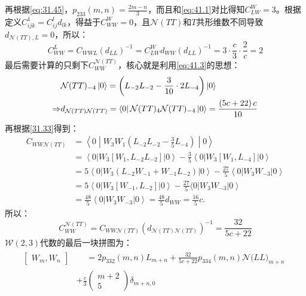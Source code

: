 再根据\ref{eq:31.45}，$p_{233}(m,n)=\frac{2m-n}3$，而且和\ref{eq:41.1}对比得知$C_{LW}^W=3$。根据定义$C_{ijk}^1=C_{ij}^ld_{lk}$，得益于$C^W_{WW}=0$，且$\mathcal{N}(TT)$和$T$共形维数不同导致$d_{\mathcal{N}(TT),L}=0$，所以：
\begin{equation}\label{eq:41.3}
	C_{WW}^L=C_{WWL}\left(d_{LL}\right)^{-1}=C_{LW}^Wd_{WW}\left(d_{LL}\right)^{-1}=3\cdot\frac c3\cdot\frac2c=2
\end{equation}
最后需要计算的只剩下$C_{WW}^{\mathcal{N}(TT)}$，核心就是利用\ref{eq:41.3}的思想：
\begin{equation}
	\begin{aligned}
		&\mathcal{N}(TT)_{-4}\left|0\right\rangle=\left(L_{-2}L_{-2}-\frac3{10}\cdot2L_{-4}\right)\left|0\right\rangle \\
		\Rightarrow&d_{\mathcal{N}(TT)\mathcal{N}(TT)}=\bra{0}\mathcal{N}(TT)_4\mathcal{N}(TT)_{-4}\ket{0}=\frac{\left(5c+22\right)c}{10}
	\end{aligned}
\end{equation}
再根据\ref{31.33}得到：
\begin{equation}
	\begin{aligned}
		C_{WW\mathcal{N}(TT)}& =\left\langle0\middle| W_3W_1\left(L_{-2}L_{-2}-\frac35L_{-4}\right) \middle| 0\right\rangle\\
		&=\left\langle0\right|W_3\left[W_1,L_{-2}L_{-2}\right]\left|0\right\rangle-\frac35\left\langle0\right|W_3\left[W_1,L_{-4}\right]\left|0\right\rangle  \\
		&=5\left<0\right|W_3\left(L_{-2}W_{-1}+W_{-1}L_{-2}\right)\left|0\right>-\frac{27}5\left<0\right|W_3W_{-3}\left|0\right> \\
		&=5\left\langle0\right|W_3\left[W_{-1},L_{-2}\right]\left|0\right\rangle-\frac{27}5\langle0|W_3W_{-3}\left|0\right\rangle  \\
		&=\frac{48}5\left\langle0\right|W_3W_{-3}\left|0\right\rangle=\frac{48}5d_{WW}=\frac{16}5c.
	\end{aligned}
\end{equation}
所以：
\begin{equation}
	C_{WW}^{\mathcal{N}(TT)}=C_{WW\mathcal{N}(TT)}\left(d_{\mathcal{N}(TT)\mathcal{N}(TT)}\right)^{-1}=\frac{32}{5c+22}
\end{equation}
$\mathcal{W}(2,3)$代数的最后一块拼图为：
\begin{equation}
	\begin{aligned}
		\left.\left[\begin{array}{c}W_{m},W_{n}\end{array}\right.\right]& \begin{aligned}&=2p_{332}(m,n)L_{m+n}+\frac{32}{5c+22}p_{334}(m,n)\mathcal{N}\big(LL\big)_{m+n}\end{aligned}  \\
		&+\frac c3\begin{pmatrix}m+2\\5\end{pmatrix}\delta_{m+n,0}
	\end{aligned}
\end{equation}
